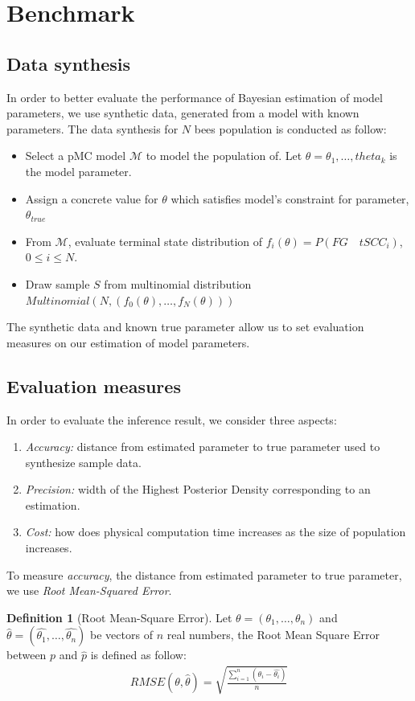 \documentclass[12pt]{article}
\theoremstyle{definition}
\newtheorem{definition}{Definition}[section]
\begin{document}
\section{Benchmark}
\subsection{Data synthesis}
In order to better evaluate the performance of Bayesian estimation of model
parameters, we use synthetic data, generated from a model with known parameters.
The data synthesis for $N$ bees population is conducted as follow:
\begin{itemize}
\item Select a pMC model $\mathcal{M}$ to model the population of. Let
  $\theta=\theta_1,\ldots,theta_k$ is the model parameter.
\item Assign a concrete value for $\theta$ which satisfies model's constraint
  for parameter, $\theta_{true}$
\item From $\mathcal{M}$, evaluate terminal state distribution of $f_i(\theta) =
  P(FG\quad tSCC_i)$, $0 \leq i \leq N$.
\item Draw sample $S$ from multinomial distribution $Multinomial(N,
  (f_0(\theta),\ldots,f_N(\theta)))$
\end{itemize}


The synthetic data and known true parameter allow us to set evaluation measures
on our estimation of model parameters.

\subsection{Evaluation measures}
In order to evaluate the inference result, we consider three aspects:
\begin{enumerate}
\item \textit{Accuracy:} distance from estimated parameter to true parameter
  used to synthesize sample data.
\item \textit{Precision:} width of the Highest Posterior Density corresponding
  to an estimation.
\item \textit{Cost:} how does physical computation time increases as the size of
  population increases.
\end{enumerate}


To measure \textit{accuracy}, the distance from estimated parameter to true parameter, we use \textit{Root
Mean-Squared Error}.
\begin{definition}[Root Mean-Square Error]
  Let $\theta = (\theta_1,\ldots,\theta_n)$ and $\hat{\theta} =
  (\hat{\theta_1},\ldots,\hat{\theta_n})$ be vectors of $n$ real numbers, the
  Root Mean Square Error between $p$ and $\hat{p}$ is defined as follow:
  \begin{align*}
    RMSE(\theta, \hat{\theta}) = \sqrt{\frac{\sum_{i=1}^n{(\theta_i - \hat{\theta_i})}}{n}}
  \end{align*}
\end{definition}
\end{document}
